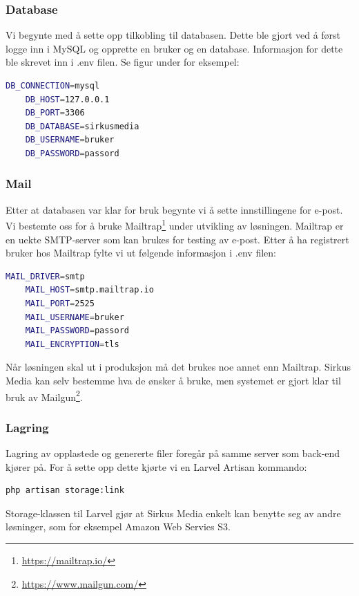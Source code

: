 \subsubsection{Database}
Vi begynte med å sette opp tilkobling til databasen. Dette ble gjort ved å først logge inn i MySQL og opprette en bruker og en database. Informasjon for dette ble skrevet inn i .env filen. Se figur under for eksempel:
\begin{lstlisting}[caption={Laravel .env database secrets},language=bash]
    DB_CONNECTION=mysql
    DB_HOST=127.0.0.1
    DB_PORT=3306
    DB_DATABASE=sirkusmedia
    DB_USERNAME=bruker
    DB_PASSWORD=passord
\end{lstlisting}

\subsubsection{Mail}
Etter at databasen var klar for bruk begynte vi å sette innstillingene for e-post. Vi bestemte oss for å bruke Mailtrap\footnote{\url{https://mailtrap.io/}} under utvikling av løsningen. Mailtrap\cite{mailtrap2019setfsad} er en uekte SMTP-server som kan brukes for testing av e-post. Etter å ha registrert bruker hos Mailtrap fylte vi ut følgende informasjon i .env filen:
\begin{lstlisting}[caption={Laravel .env mail secrets}, language=bash]
    MAIL_DRIVER=smtp
    MAIL_HOST=smtp.mailtrap.io
    MAIL_PORT=2525
    MAIL_USERNAME=bruker
    MAIL_PASSWORD=passord
    MAIL_ENCRYPTION=tls
\end{lstlisting}

Når løsningen skal ut i produksjon må det brukes noe annet enn Mailtrap. Sirkus Media kan selv bestemme hva de ønsker å bruke, men systemet er gjort klar til bruk av Mailgun\footnote{\url{https://www.mailgun.com/}}.

\subsubsection{Lagring}
Lagring av opplastede og genererte filer foregår på samme server som back-end kjører på. For å sette opp dette kjørte vi en Larvel Artisan kommando:
\begin{lstlisting}[caption={Laravel Artisan kommando for å sette opp lagring av filer}, language=bash]
    php artisan storage:link
\end{lstlisting}
Storage-klassen til Larvel gjør at Sirkus Media enkelt kan benytte seg av andre løsninger, som for eksempel Amazon Web Servies S3.

